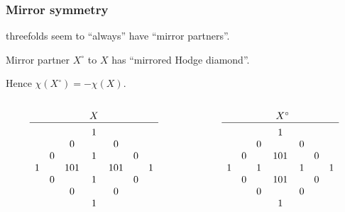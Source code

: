 \begin{frame}
\frametitle{Mirror symmetry}

\begin{itemize}
	\item
    \CY threefolds seem to ``always'' have ``mirror partners''.
    {
	\item
    Mirror partner $X^\circ$ to $X$ has ``mirrored Hodge diamond''.
    }
    {
	\item
    Hence $\chi(X^\circ) = - \chi(X)$.
    }
\end{itemize}

\unskip
\begin{columns}[onlytextwidth]
    {
        \begin{column}{0.48\textwidth}
            \[
                \begin{array}[c]{ccccccc}
                    &&& X                    \\
                    \hline                   \\[-1.8ex]
                    &&& 1                    \\
                    &&  0 && 0               \\
                    &   0 && 1   && 0        \\
                        1 && 101 && 101 && 1 \\
                    &   0 && 1   && 0        \\
                    &&  0 && 0               \\
                    &&& 1
                \end{array}
            \]
        \end{column}
    }

    {
        \begin{column}{0.48\textwidth}
            \[
                \begin{array}[c]{ccccccc}
                    &&& \phantom{^\circ}X^\circ \\
                    \hline                      \\[-1.8ex]
                    &&& 1                       \\  
                    &&  0 && 0                  \\
                    &   0 && 101 && 0           \\
                        1 && 1   && 1 && 1      \\
                    &   0 && 101 && 0           \\
                    &&  0 && 0                  \\
                    &&& 1
                \end{array}
            \]
        \end{column}
    }
\end{columns}

\end{frame}

